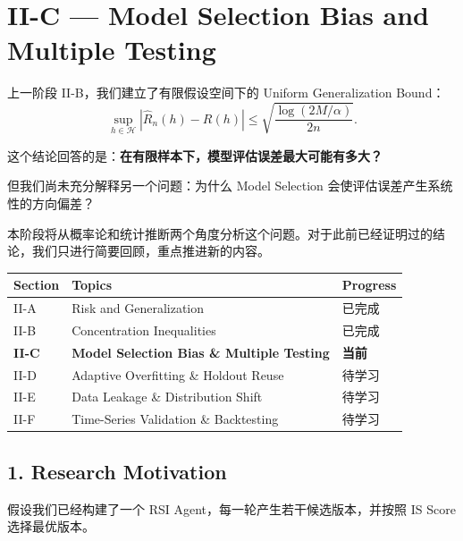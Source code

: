 \hypertarget{part-2-16-0001-ii-c-model-selection-bias-and-multiple-testing}{%
\section{II-C --- Model Selection Bias and Multiple Testing}\label{part-2-16-0001-ii-c-model-selection-bias-and-multiple-testing}}

上一阶段 II-B，我们建立了有限假设空间下的 Uniform Generalization Bound：
\[\sup_{h\in\mathcal H}
|\widehat R_n(h)-R(h)|
\leq
\sqrt{\frac{\log(2M/\alpha)}{2n}}.\]

这个结论回答的是：\textbf{在有限样本下，模型评估误差最大可能有多大？}

但我们尚未充分解释另一个问题：为什么 Model Selection 会使评估误差产生系统性的方向偏差？

本阶段将从概率论和统计推断两个角度分析这个问题。对于此前已经证明过的结论，我们只进行简要回顾，重点推进新的内容。

\begin{readertable}
\begin{longtable}[]{@{}
  >{\raggedright\arraybackslash}p{}
  >{\raggedright\arraybackslash}p{}
  >{\raggedright\arraybackslash}p{}@{}}
\toprule
Section & Topics & Progress \\
\midrule
\endhead
II-A & Risk and Generalization & 已完成 \\
II-B & Concentration Inequalities & 已完成 \\
\textbf{II-C} & \textbf{Model Selection Bias \& Multiple Testing} & \textbf{当前} \\
II-D & Adaptive Overfitting \& Holdout Reuse & 待学习 \\
II-E & Data Leakage \& Distribution Shift & 待学习 \\
II-F & Time-Series Validation \& Backtesting & 待学习 \\
\bottomrule
\end{longtable}
\end{readertable}

\hypertarget{part-2-16-0001-research-motivation}{%
\subsection{1. Research Motivation}\label{part-2-16-0001-research-motivation}}

假设我们已经构建了一个 RSI Agent，每一轮产生若干候选版本，并按照 IS Score 选择最优版本。

